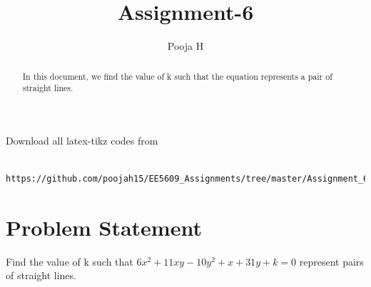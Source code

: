 \documentclass[journal,12pt,twocolumn]{IEEEtran}
\begin{document}
	\makeatother
	\let\StandardTheFigure\thefigure
	\let\vec\mathbf
	\renewcommand{\thefigure}{\theproblem}
	\def\putbox#1#2#3{\makebox[0in][l]{\makebox[#1][l]{}\raisebox{\baselineskip}[0in][0in]{\raisebox{#2}[0in][0in]{#3}}}}
	\def\rightbox#1{\makebox[0in][r]{#1}}
	\def\centbox#1{\makebox[0in]{#1}}
	\def\topbox#1{\raisebox{-\baselineskip}[0in][0in]{#1}}
	\def\midbox#1{\raisebox{-0.5\baselineskip}[0in][0in]{#1}}
	\vspace{3cm}
	\title{Assignment-6}
	\author{Pooja H \\ }
	\maketitle
	\newpage
	\bigskip
	\renewcommand{\thefigure}{\theenumi}
	\renewcommand{\thetable}{\theenumi}
\begin{abstract}
	In this document, we find the value of k such that the equation represents a pair of straight lines.
\end{abstract}
Download all latex-tikz codes from 
\begin{lstlisting}
    https://github.com/poojah15/EE5609_Assignments/tree/master/Assignment_6
\end{lstlisting}
\section{Problem Statement}
Find the value of k such that $6x^2 + 11xy - 10y^2 + x + 31y + k =0$ represent pairs of straight lines.
\end{document}
